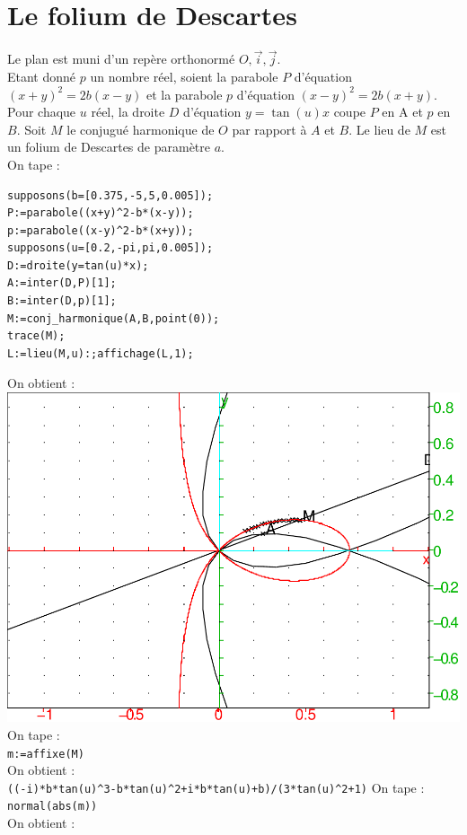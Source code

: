\documentclass[a4paper,11pt]{book}
\begin{document}
\section{Le folium de Descartes}
Le plan est muni d'un rep\`ere orthonorm\'e $O,\overrightarrow{i},\overrightarrow{j}$.\\
Etant donn\'e $p$ un nombre r\'eel, soient la parabole $P$ d'\'equation 
$(x+y)^2=2b(x-y)$ et  la parabole $p$ d'\'equation $(x-y)^2=2b(x+y)$.\\
Pour chaque $u$ r\'eel, la droite $D$ d'\'equation $y=\tan(u)x$ coupe $P$ en A 
et $p$ en $B$. Soit $M$ le conjugu\'e harmonique de $O$ par rapport \`a $A$ et 
$B$. Le lieu de $M$ est un folium de Descartes de param\`etre $a$.\\
On tape  :
\begin{verbatim}
supposons(b=[0.375,-5,5,0.005]);
P:=parabole((x+y)^2-b*(x-y));
p:=parabole((x-y)^2-b*(x+y));
supposons(u=[0.2,-pi,pi,0.005]);
D:=droite(y=tan(u)*x);
A:=inter(D,P)[1];
B:=inter(D,p)[1];
M:=conj_harmonique(A,B,point(0));
trace(M);
L:=lieu(M,u):;affichage(L,1);
\end{verbatim}
On obtient :\\
\includegraphics[width=\textwidth]{foliumd}\\
On tape :\\
{\tt m:=affixe(M)}\\
On obtient :\\
{\tt ((-i)*b*tan(u)\verb|^|3-b*tan(u)\verb|^|2+i*b*tan(u)+b)/(3*tan(u)\verb|^|2+1)}
On tape :\\
{\tt normal(abs(m))}\\
On obtient :\\
\end{document}
